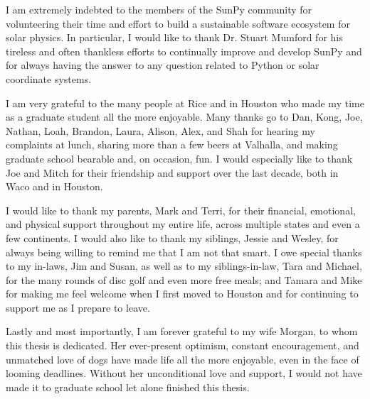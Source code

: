 \begin{acknowledgements}
I am extremely indebted to the members of the SunPy community for volunteering their time and effort to build a sustainable software ecosystem for solar physics. In particular, I would like to thank Dr. Stuart Mumford for his tireless and often thankless efforts to continually improve and develop SunPy and for always having the answer to any question related to Python or solar coordinate systems.

I am very grateful to the many people at Rice and in Houston who made my time as a graduate student all the more enjoyable. Many thanks go to Dan, Kong, Joe, Nathan, Loah, Brandon, Laura, Alison, Alex, and Shah for hearing my complaints at lunch, sharing more than a few beers at Valhalla, and making graduate school bearable and, on occasion, fun. I would especially like to thank Joe and Mitch for their friendship and support over the last decade, both in Waco and in Houston.

I would like to thank my parents, Mark and Terri, for their financial, emotional, and physical support throughout my entire life, across multiple states and even a few continents. I would also like to thank my siblings, Jessie and Wesley, for always being willing to remind me that I am not that smart. I owe special thanks to my in-laws, Jim and Susan, as well as to my siblings-in-law, Tara and Michael, for the many rounds of disc golf and even more free meals; and Tamara and Mike for making me feel welcome when I first moved to Houston and for continuing to support me as I prepare to leave.

Lastly and most importantly, I am forever grateful to my wife Morgan, to whom this thesis is dedicated. Her ever-present optimism, constant encouragement, and unmatched love of dogs have made life all the more enjoyable, even in the face of looming deadlines. Without her unconditional love and support, I would not have made it to graduate school let alone finished this thesis.
\end{acknowledgements}
